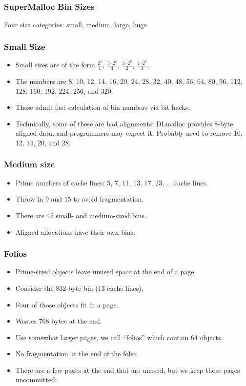 \documentclass[xcolor=dvipsnames,14pt]{beamer}
\begin{document}
\begin{frame}
\frametitle{SuperMalloc Bin Sizes}

Four size categories: small, medium, large, huge.
\end{frame}

\begin{frame}
\frametitle{Small Size}

\begin{itemize}
\item Small sizes are of the form $\frac{2^k}{1}$, $\frac{5 \cdot 2^k}{4}$, $\frac{3 \cdot 2^k}{2}$, $\frac{7 \cdot 2^k}{4}$.  
\item The numbers are 8, 10, 12, 14, 16, 20, 24, 28, 32, 40, 48, 56, 64, 80, 96, 112, 128, 160, 192, 224, 256, and 320.
\item These admit fast calculation of bin numbers via bit hacks.
\item Technically, some of these are bad alignments:  DLmalloc provides 8-byte aligned data, and programmers may expect it.  Probably need to remove 10, 12, 14, 20, and 28.
\end{itemize}
\end{frame}

\begin{frame}
\frametitle{Medium size}
\begin{itemize}
\item Prime numbers of cache lines: 5, 7, 11, 13, 17, 23,
  $\ldots$ cache lines.

\item Throw in 9 and 15 to avoid fragmentation.

\item There are 45 small- and medium-sized bins.
\item Aligned allocations have their own bins.
\end{itemize}
\end{frame}

\begin{frame}
\frametitle{Folios}

\begin{itemize}
\item Prime-sized objects leave unused space at the end of a page.

\item Consider the 832-byte bin (13 cache lines). 

\item Four of those objects fit in a page.
\item Wastes 768 bytes at the end.
\item Use somewhat larger pages, we call ``folios'' which contain 64 objects.
\item No fragmentation at the end of the folio.
\item There are a few pages at the end that are unused, but we keep those pages uncommitted.
\end{itemize}
\end{frame}
\end{document}

